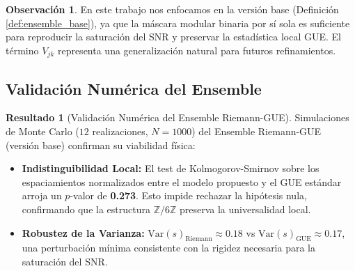 \documentclass[12pt, a4paper]{article}
\theoremstyle{plain}
\theoremstyle{definition}
\newtheorem{observacion}[teorema]{Observación}
\newtheorem{resultado}[teorema]{Resultado} %
\theoremstyle{remark}
\newcommand{\Z}{\mathbb{Z}}
\begin{document}
\begin{observacion}
En este trabajo nos enfocamos en la versión base (Definición \ref{def:ensemble_base}), ya que la máscara modular binaria por sí sola es suficiente para reproducir la saturación del SNR y preservar la estadística local GUE. El término $V_{jk}$ representa una generalización natural para futuros refinamientos.
\end{observacion}

\subsection{Validación Numérica del Ensemble}
\label{subsec:validacion_ensemble}

\begin{resultado}[Validación Numérica del Ensemble Riemann-GUE]
Simulaciones de Monte Carlo ($12$ realizaciones, $N=1000$) del Ensemble Riemann-GUE (versión base) confirman su viabilidad física:
\begin{itemize}
    \item \textbf{Indistinguibilidad Local:} El test de Kolmogorov-Smirnov sobre los espaciamientos normalizados entre el modelo propuesto y el GUE estándar arroja un $p$-valor de \textbf{0.273}. Esto impide rechazar la hipótesis nula, confirmando que la estructura $\Z/6\Z$ preserva la universalidad local.
    \item \textbf{Robustez de la Varianza:} $\text{Var}(s)_{\text{Riemann}} \approx 0.18$ vs $\text{Var}(s)_{\text{GUE}} \approx 0.17$, una perturbación mínima consistente con la rigidez necesaria para la saturación del SNR.
\end{itemize}
\end{resultado}
\end{document}
